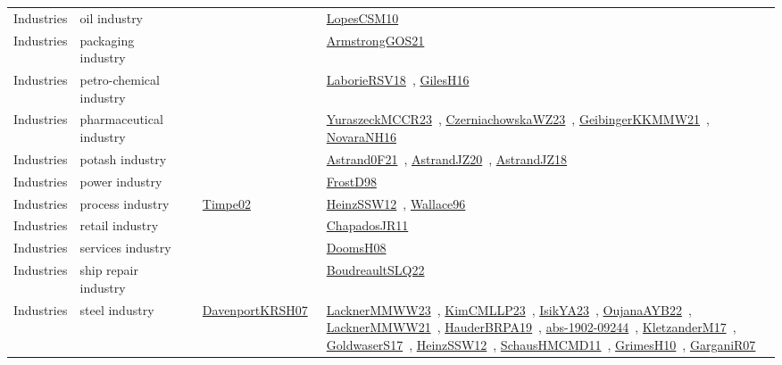 {\begin{longtable}{lp{3cm}>{\raggedright\arraybackslash}p{6cm}>{\raggedright\arraybackslash}p{6cm}>{\raggedright\arraybackslash}p{8cm}}
Industries & oil industry &  &  & \href{articles/LopesCSM10.pdf}{LopesCSM10}~\cite{LopesCSM10}\\
Industries & packaging industry &  &  & \href{papers/ArmstrongGOS21.pdf}{ArmstrongGOS21}~\cite{ArmstrongGOS21}\\
Industries & petro-chemical industry &  &  & \href{articles/LaborieRSV18.pdf}{LaborieRSV18}~\cite{LaborieRSV18}, \href{papers/GilesH16.pdf}{GilesH16}~\cite{GilesH16}\\
Industries & pharmaceutical industry &  &  & \href{articles/YuraszeckMCCR23.pdf}{YuraszeckMCCR23}~\cite{YuraszeckMCCR23}, \href{articles/CzerniachowskaWZ23.pdf}{CzerniachowskaWZ23}~\cite{CzerniachowskaWZ23}, \href{papers/GeibingerKKMMW21.pdf}{GeibingerKKMMW21}~\cite{GeibingerKKMMW21}, \href{articles/NovaraNH16.pdf}{NovaraNH16}~\cite{NovaraNH16}\\
Industries & potash industry &  &  & \href{papers/Astrand0F21.pdf}{Astrand0F21}~\cite{Astrand0F21}, \href{articles/AstrandJZ20.pdf}{AstrandJZ20}~\cite{AstrandJZ20}, \href{papers/AstrandJZ18.pdf}{AstrandJZ18}~\cite{AstrandJZ18}\\
Industries & power industry &  &  & \href{papers/FrostD98.pdf}{FrostD98}~\cite{FrostD98}\\
Industries & process industry &  & \href{articles/Timpe02.pdf}{Timpe02}~\cite{Timpe02} & \href{articles/HeinzSSW12.pdf}{HeinzSSW12}~\cite{HeinzSSW12}, \href{articles/Wallace96.pdf}{Wallace96}~\cite{Wallace96}\\
Industries & retail industry &  &  & \href{papers/ChapadosJR11.pdf}{ChapadosJR11}~\cite{ChapadosJR11}\\
Industries & services industry &  &  & \href{papers/DoomsH08.pdf}{DoomsH08}~\cite{DoomsH08}\\
Industries & ship repair industry &  &  & \href{papers/BoudreaultSLQ22.pdf}{BoudreaultSLQ22}~\cite{BoudreaultSLQ22}\\
Industries & steel industry &  & \href{papers/DavenportKRSH07.pdf}{DavenportKRSH07}~\cite{DavenportKRSH07} & \href{articles/LacknerMMWW23.pdf}{LacknerMMWW23}~\cite{LacknerMMWW23}, \href{papers/KimCMLLP23.pdf}{KimCMLLP23}~\cite{KimCMLLP23}, \href{articles/IsikYA23.pdf}{IsikYA23}~\cite{IsikYA23}, \href{papers/OujanaAYB22.pdf}{OujanaAYB22}~\cite{OujanaAYB22}, \href{papers/LacknerMMWW21.pdf}{LacknerMMWW21}~\cite{LacknerMMWW21}, \href{articles/HauderBRPA19.pdf}{HauderBRPA19}~\cite{HauderBRPA19}, \href{articles/abs-1902-09244.pdf}{abs-1902-09244}~\cite{abs-1902-09244}, \href{papers/KletzanderM17.pdf}{KletzanderM17}~\cite{KletzanderM17}, \href{papers/GoldwaserS17.pdf}{GoldwaserS17}~\cite{GoldwaserS17}, \href{articles/HeinzSSW12.pdf}{HeinzSSW12}~\cite{HeinzSSW12}, \href{articles/SchausHMCMD11.pdf}{SchausHMCMD11}~\cite{SchausHMCMD11}, \href{papers/GrimesH10.pdf}{GrimesH10}~\cite{GrimesH10}, \href{papers/GarganiR07.pdf}{GarganiR07}~\cite{GarganiR07}\\

\end{longtable}}

